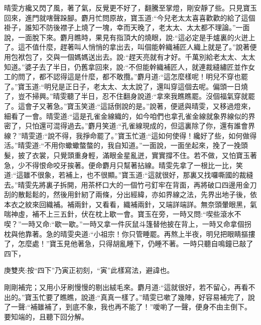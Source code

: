 \begin{parag}
    晴雯方纔又閃了風，著了氣，反覺更不好了，翻騰至掌燈，剛安靜了些。只見寶玉回來，進門就嗐聲跺腳。麝月忙問原故，寶玉道:“今兒老太太喜喜歡歡的給了這個褂子，誰知不防後襟子上燒了一塊，幸而天晚了，老太太、太太都不理論。”一面說，一面脫下來。麝月瞧時，果見有指頂大的燒眼，說:“這必定是手爐裏的火迸上了。這不值什麼，趕著叫人悄悄的拿出去，叫個能幹織補匠人織上就是了。”說著便用包袱包了，交與一個媽媽送出去。說:“趕天亮就有才好。千萬別給老太太、太太知道。”婆子去了半日，仍舊拿回來，說:“不但能幹織補匠人，就連裁縫繡匠並作女工的問了，都不認得這是什麼，都不敢攬。”麝月道:“這怎麼樣呢！明兒不穿也罷了。”寶玉道:“明兒是正日子，老太太、太太說了，還叫穿這個去呢。偏頭一日燒了，豈不掃興。”晴雯聽了半日，忍不住翻身說道:“拿來我瞧瞧罷。沒個福氣穿就罷了。這會子又著急。”寶玉笑道:“這話倒說的是。”說著，便遞與晴雯，又移過燈來，細看了一會。晴雯道:“這是孔雀金線織的，如今咱們也拿孔雀金線就象界線似的界密了，只怕還可混得過去。”麝月笑道:“孔雀線現成的，但這裏除了你，還有誰會界線？”晴雯道:“說不得，我掙命罷了。”寶玉忙道:“這如何使得！纔好了些，如何做得活。”晴雯道:“不用你蠍蠍螫螫的，我自知道。”一面說，一面坐起來，挽了一挽頭髮，披了衣裳，只覺頭重身輕，滿眼金星亂迸，實實撐不住。若不做，又怕寶玉著急，少不得恨命咬牙挨著。便命麝月只幫著拈線。晴雯先拿了一根比一比，笑道:“這雖不很象，若補上，也不很顯。”寶玉道:“這就很好，那裏又找囉嘶國的裁縫去。”晴雯先將裏子拆開，用茶杯口大的一個竹弓釘牢在背面，再將破口四邊用金刀刮的散鬆鬆的，然後用針紉了兩條，分出經緯，亦如界線之法，先界出地子後，依本衣之紋來回織補。補兩針，又看看，織補兩針，又端詳端詳。無奈頭暈眼黑，氣喘神虛，補不上三五針，伏在枕上歇一會。寶玉在旁，一時又問:“喫些滾水不喫？”一時又命:“歇一歇。”一時又拿一件灰鼠斗篷替他披在背上，一時又命拿個拐枕與他靠著。急的晴雯央道:“小祖宗！你只管睡罷。再熬上半夜，明兒把眼睛摳摟了，怎麼處！”寶玉見他著急，只得胡亂睡下，仍睡不著。一時只聽自鳴鐘已敲了四下，\begin{note}庚雙夾:按“四下”乃寅正初刻，“寅”此樣寫法，避諱也。\end{note}剛剛補完；又用小牙刷慢慢的剔出絨毛來。麝月道:“這就很好，若不留心，再看不出的。”寶玉忙要了瞧瞧，說道:“真真一樣了。”晴雯已嗽了幾陣，好容易補完了，說了一聲:“補雖補了，到底不象，我也再不能了！”噯喲了一聲，便身不由主倒下。要知端的，且聽下回分解。
\end{parag}
